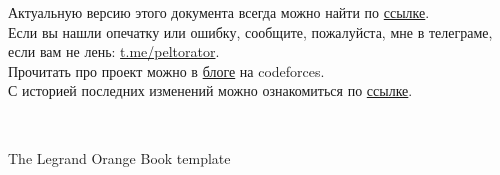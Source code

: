\documentclass[11pt,fleqn, openany]{book} %
\begin{document}

\begingroup
\thispagestyle{empty} %
\vfill
\endgroup



\newpage


\thispagestyle{empty}

Актуальную версию этого документа всегда можно найти по \href{https://peltorator.ru/cp_book.pdf}{ссылке}.\\
Если вы нашли опечатку или ошибку, сообщите, пожалуйста, мне в телеграме, если вам не лень: \href{https://t.me/peltorator}{t.me/peltorator}.\\
Прочитать про проект можно в \href{https://codeforces.com/blog/entry/91258}{блоге} на codeforces.\\
С историей последних изменений можно ознакомиться по \href{https://peltorator.ru/cp_book_changes}{ссылке}.

~\vfill


\noindent The Legrand Orange Book template



\usechapterimagefalse %
\end{document}
